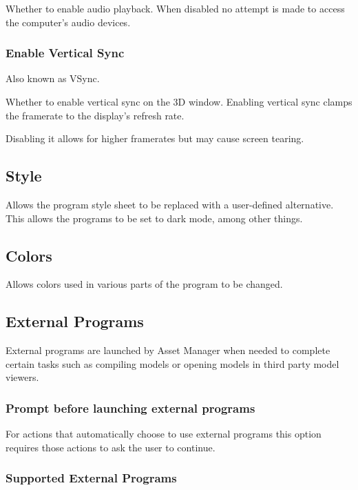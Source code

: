\documentclass[10pt, a4paper, titlepage, oneside]{article}
\begin{document}
Whether to enable audio playback. When disabled no attempt is made to access the computer's audio devices.

\subsubsection{Enable Vertical Sync}

Also known as VSync.

Whether to enable vertical sync on the 3D window. Enabling vertical sync clamps the framerate to the display's refresh rate.

Disabling it allows for higher framerates but may cause screen tearing.

\subsection{Style}

Allows the program style sheet to be replaced with a user-defined alternative. This allows the programs to be set to dark mode, among other things.

\subsection{Colors}

Allows colors used in various parts of the program to be changed.

\newpage

\subsection{External Programs}

External programs are launched by Asset Manager when needed to complete certain tasks such as compiling models or opening models in third party model viewers.

\subsubsection{Prompt before launching external programs}

For actions that automatically choose to use external programs this option requires those actions to ask the user to continue.

\subsubsection{Supported External Programs}
\label{sec:external_programs}
\end{document}
